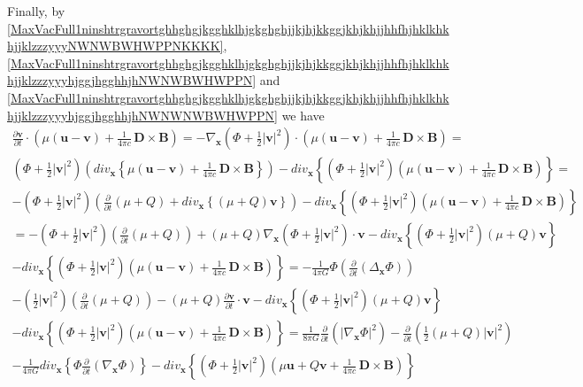 \documentclass{article}
\theoremstyle{definition}
\theoremstyle{remark}
\renewcommand{\vec}[1]{\mathbf{#1}}
\newcommand{\er}{\eqref}
\newcommand{\er}{\eqref}
\begin{document}
Finally, by
\er{MaxVacFull1ninshtrgravortghhghgjkgghklhjgkghghjjkjhjkkggjkhjkhjjhhfhjhklkhkhjjklzzzyyyNWNWBWHWPPNKKKK},
\er{MaxVacFull1ninshtrgravortghhghgjkgghklhjgkghghjjkjhjkkggjkhjkhjjhhfhjhklkhkhjjklzzzyyyhjggjhgghhjhNWNWBWHWPPN}
and
\er{MaxVacFull1ninshtrgravortghhghgjkgghklhjgkghghjjkjhjkkggjkhjkhjjhhfhjhklkhkhjjklzzzyyyhjggjhgghhjhNWNWNWBWHWPPN}
we have
\begin{multline}\label{vhfffngghkjgghggtghjgfhjoyuiyuyhiyyukukyihyuSYSPNNWhgjgghyuyy8yuyughghhyttyytgghhghghgghjhkjhCCmmGGKKuiiuuihjgghghhhjhjhjhj}
\frac{\partial\vec v}{\partial t}\cdot\left( \mu
 \left(\vec
u-\vec v\right) +\frac{1}{4\pi c}\,\vec D\times \vec
B\right)=-\nabla_{\vec x}\left(\Phi+\frac{1}{2}\left|\vec
v\right|^2\right)\cdot \left( \mu
 \left(\vec
u-\vec v\right) +\frac{1}{4\pi c}\,\vec D\times \vec B\right)=\\
\left(\Phi+\frac{1}{2}\left|\vec v\right|^2\right) \left(div_{\vec
x}\left\{ \mu
 \left(\vec
u-\vec v\right) +\frac{1}{4\pi c}\,\vec D\times \vec
B\right\}\right)-div_{\vec x}\left\{\left(\Phi+\frac{1}{2}\left|\vec
v\right|^2\right)\left( \mu
 \left(\vec
u-\vec v\right) +\frac{1}{4\pi c}\,\vec D\times \vec
B\right)\right\}=\\
-\left(\Phi+\frac{1}{2}\left|\vec v\right|^2\right)
\left(\frac{\partial}{\partial t}\left(\mu+Q\right)+div_{\vec
x}\left\{\left(\mu+Q\right)\vec v\right\}\right)-div_{\vec
x}\left\{\left(\Phi+\frac{1}{2}\left|\vec v\right|^2\right)\left(
\mu
 \left(\vec
u-\vec v\right) +\frac{1}{4\pi c}\,\vec D\times \vec
B\right)\right\}\\= -\left(\Phi+\frac{1}{2}\left|\vec
v\right|^2\right) \left(\frac{\partial}{\partial
t}\left(\mu+Q\right)\right)+\left(\mu+Q\right)\nabla_{\vec
x}\left(\Phi+\frac{1}{2}\left|\vec v\right|^2\right)\cdot\vec v-
div_{\vec x}\left\{\left(\Phi+\frac{1}{2}\left|\vec
v\right|^2\right)\left(\mu+Q\right)\vec v\right\}\\-div_{\vec
x}\left\{\left(\Phi+\frac{1}{2}\left|\vec v\right|^2\right)\left(
\mu
 \left(\vec
u-\vec v\right) +\frac{1}{4\pi c}\,\vec D\times \vec
B\right)\right\}=-\frac{1}{4\pi G}\Phi
\left(\frac{\partial}{\partial
t}\left(\Delta_{\vec x}\Phi\right)\right)\\
-\left(\frac{1}{2}\left|\vec v\right|^2\right)
\left(\frac{\partial}{\partial
t}\left(\mu+Q\right)\right)-\left(\mu+Q\right)\frac{\partial\vec
v}{\partial t}\cdot\vec v- div_{\vec
x}\left\{\left(\Phi+\frac{1}{2}\left|\vec
v\right|^2\right)\left(\mu+Q\right)\vec v\right\}\\-div_{\vec
x}\left\{\left(\Phi+\frac{1}{2}\left|\vec v\right|^2\right)\left(
\mu
 \left(\vec
u-\vec v\right) +\frac{1}{4\pi c}\,\vec D\times \vec
B\right)\right\}=\frac{1}{8\pi G} \frac{\partial}{\partial
t}\left(\left|\nabla_{\vec x}\Phi\right|^2\right) -
\frac{\partial}{\partial
t}\left(\frac{1}{2}\left(\mu+Q\right)\left|\vec
v\right|^2\right)\\-\frac{1}{4\pi G}div_{\vec x}\left\{\Phi
\frac{\partial}{\partial t}\left(\nabla_{\vec
x}\Phi\right)\right\}-div_{\vec
x}\left\{\left(\Phi+\frac{1}{2}\left|\vec v\right|^2\right)\left(
\mu \vec u+Q\vec v+\frac{1}{4\pi c}\,\vec D\times \vec
B\right)\right\}
\end{multline}
\end{document}
